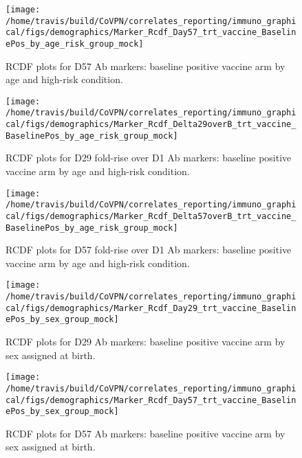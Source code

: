 \documentclass[]{book}
\theoremstyle{definition}
\theoremstyle{definition}
\theoremstyle{definition}
\newcommand{\1}{\mathbbm{1}}
\begin{document}
\clearpage
\begin{figure}[H]

{\centering \texttt{[image: /home/travis/build/CoVPN/correlates\_reporting/immuno\_graphical/figs/demographics/Marker\_Rcdf\_Day57\_trt\_vaccine\_BaselinePos\_by\_age\_risk\_group\_mock]} 

}

\caption{RCDF plots for D57 Ab markers: baseline positive vaccine arm by age and high-risk condition.}\label{fig:unnamed-chunk-101}
\end{figure}

\clearpage
\begin{figure}[H]

{\centering \texttt{[image: /home/travis/build/CoVPN/correlates\_reporting/immuno\_graphical/figs/demographics/Marker\_Rcdf\_Delta29overB\_trt\_vaccine\_BaselinePos\_by\_age\_risk\_group\_mock]} 

}

\caption{RCDF plots for D29 fold-rise over D1 Ab markers: baseline positive vaccine arm by age and high-risk condition.}\label{fig:unnamed-chunk-102}
\end{figure}

\clearpage
\begin{figure}[H]

{\centering \texttt{[image: /home/travis/build/CoVPN/correlates\_reporting/immuno\_graphical/figs/demographics/Marker\_Rcdf\_Delta57overB\_trt\_vaccine\_BaselinePos\_by\_age\_risk\_group\_mock]} 

}

\caption{RCDF plots for D57 fold-rise over D1 Ab markers: baseline positive vaccine arm by age and high-risk condition.}\label{fig:unnamed-chunk-103}
\end{figure}

\clearpage
\begin{figure}[H]

{\centering \texttt{[image: /home/travis/build/CoVPN/correlates\_reporting/immuno\_graphical/figs/demographics/Marker\_Rcdf\_Day29\_trt\_vaccine\_BaselinePos\_by\_sex\_group\_mock]} 

}

\caption{RCDF plots for D29 Ab markers: baseline positive vaccine arm by sex assigned at birth.}\label{fig:unnamed-chunk-104}
\end{figure}

\clearpage
\begin{figure}[H]

{\centering \texttt{[image: /home/travis/build/CoVPN/correlates\_reporting/immuno\_graphical/figs/demographics/Marker\_Rcdf\_Day57\_trt\_vaccine\_BaselinePos\_by\_sex\_group\_mock]} 

}

\caption{RCDF plots for D57 Ab markers: baseline positive vaccine arm by sex assigned at birth.}\label{fig:unnamed-chunk-105}
\end{figure}
\end{document}
